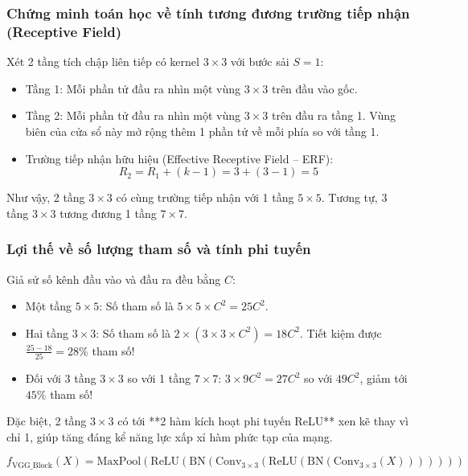 \documentclass[12pt,a4paper]{article}
\begin{document}
\subsubsection{Chứng minh toán học về tính tương đương trường tiếp nhận (Receptive Field)}
Xét 2 tầng tích chập liên tiếp có kernel $3 \times 3$ với bước sải $S=1$:
\begin{itemize}[leftmargin=*]
    \item Tầng 1: Mỗi phần tử đầu ra nhìn một vùng $3 \times 3$ trên đầu vào gốc.
    \item Tầng 2: Mỗi phần tử đầu ra nhìn một vùng $3 \times 3$ trên đầu ra tầng 1. Vùng biên của cửa sổ này mở rộng thêm 1 phần tử về mỗi phía so với tầng 1.
    \item Trường tiếp nhận hữu hiệu (Effective Receptive Field -- ERF):
    \begin{equation}
        R_2 = R_1 + (k - 1) = 3 + (3 - 1) = 5
    \end{equation}
\end{itemize}
Như vậy, 2 tầng $3 \times 3$ có cùng trường tiếp nhận với 1 tầng $5 \times 5$. Tương tự, 3 tầng $3 \times 3$ tương đương 1 tầng $7 \times 7$.

\subsubsection{Lợi thế về số lượng tham số và tính phi tuyến}
Giả sử số kênh đầu vào và đầu ra đều bằng $C$:
\begin{itemize}[leftmargin=*]
    \item Một tầng $5 \times 5$: Số tham số là $5 \times 5 \times C^2 = 25 C^2$.
    \item Hai tầng $3 \times 3$: Số tham số là $2 \times (3 \times 3 \times C^2) = 18 C^2$. Tiết kiệm được $\frac{25 - 18}{25} = 28\%$ tham số!
    \item Đối với 3 tầng $3 \times 3$ so với 1 tầng $7 \times 7$: $3 \times 9 C^2 = 27 C^2$ so với $49 C^2$, giảm tới $45\%$ tham số!
\end{itemize}
Đặc biệt, 2 tầng $3 \times 3$ có tới **2 hàm kích hoạt phi tuyến ReLU** xen kẽ thay vì chỉ 1, giúp tăng đáng kể năng lực xấp xỉ hàm phức tạp của mạng.

\begin{equation}
    f_{\text{VGG\_Block}}(X) = \text{MaxPool}\left(\text{ReLU}\left(\text{BN}\left(\text{Conv}_{3\times3}\left(\text{ReLU}\left(\text{BN}\left(\text{Conv}_{3\times3}(X)\right)\right)\right)\right)\right)\right)
\end{equation}
\end{document}
